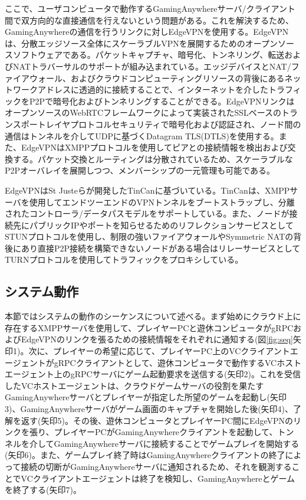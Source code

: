 ここで、ユーザコンピュータで動作するGamingAnywhereサーバ/クライアント間で双方向的な直接通信を行えないという問題がある。これを解決するため、GamingAnywhereの通信を行うリンクに対しEdgeVPN\cite{edgevpn}を使用する。EdgeVPNは、分散エッジソース全体にスケーラブルVPNを展開するためのオープンソースソフトウェアである。パケットキャプチャ、暗号化、トンネリング、転送およびNATトラバーサルのサポートが組み込まれている。エッジデバイスとNAT/ファイアウォール、およびクラウドコンピューティングリソースの背後にあるネットワークアドレスに透過的に接続することで、インターネットを介したトラフィックをP2Pで暗号化およびトンネリングすることができる。EdgeVPNリンクはオープンソースのWebRTCフレームワークによって実装されたSSLベースのトランスポートレイヤプロトコルセキュリティで暗号化および認証され、ノード間の通信はトンネルを介してUDPに基づくDatagram TLS(DTLS)\cite{dtlc}を使用する。また、EdgeVPNはXMPPプロトコル\cite{xmpp}を使用してピアとの接続情報を検出および交換する。パケット交換とルーティングは分散されているため、スケーラブルなP2Pオーバレイを展開しつつ、メンバーシップの一元管理も可能である。

EdgeVPNはSt Justeら\cite{tincan}が開発したTinCanに基づいている。TinCanは、XMPPサーバを使用してエンドツーエンドのVPNトンネルをブートストラップし、分離されたコントローラ/データパスモデルをサポートしている。また、ノードが接続先にパブリックIPやポートを知らせるためのリフレクションサービスとしてSTUNプロトコル\cite{stun}を使用し、制限の強いファイアウォールやSymmetric NATの背後にあり直接P2P接続を構築できないノードがある場合はリレーサービスとしてTURNプロトコル\cite{turn}を使用してトラフィックをプロキシしている。

\subsection{システム動作}
本節ではシステムの動作のシーケンスについて述べる。まず始めにクラウド上に存在するXMPPサーバを使用して、プレイヤーPCと遊休コンピュータがgRPCおよびEdgeVPNのリンクを張るための接続情報をそれぞれに通知する(図\ref{fig:seq}矢印1)。次に、プレイヤーの希望に応じて、プレイヤーPC上のVCクライアントエージェントがgRPCクライアントとして、遊休コンピュータで動作するVCホストエージェント上のgRPCサーバにゲーム起動要求を送信する(矢印2)。これを受信したVCホストエージェントは、クラウドゲームサーバの役割を果たすGamingAnywhereサーバとプレイヤーが指定した所望のゲームを起動し(矢印3)、GamingAnywhereサーバがゲーム画面のキャプチャを開始した後(矢印4)、了解を返す(矢印5)。その後、遊休コンピュータとプレイヤーPC間にEdgeVPNのリンクを張り、プレイヤーPCがGamingAnywhereクライアントを起動して、トンネルを介してGamingAnywhereサーバに接続することでゲームプレイを開始する(矢印6)。また、ゲームプレイ終了時はGamingAnywhereクライアントの終了によって接続の切断がGamingAnywhereサーバに通知されるため、それを観測することでVCクライアントエージェントは終了を検知し、GamingAnywhereとゲームを終了する(矢印7)。

